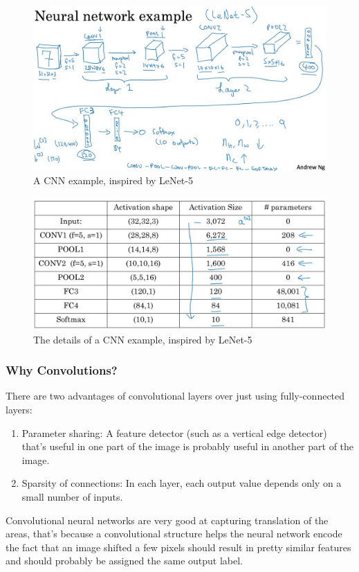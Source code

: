 \documentclass[UTF8]{article}
\begin{document}
\begin{figure}[htb]
    \centering
    \includegraphics[width=40em]{figures/cnn-example}
    \caption{A CNN example, inspired by LeNet-5}
    \label{fig:cnn-example}
\end{figure}

\begin{figure}[htb]
    \centering
    \includegraphics[width=40em]{figures/cnn-example-details}
    \caption{The details of a CNN example, inspired by LeNet-5}
    \label{fig:cnn-example-details}
\end{figure}

\subsubsection{Why Convolutions?}
There are two advantages of convolutional layers over just using fully-connected layers:
\begin{enumerate}
    \item Parameter sharing: A feature detector (such as a vertical edge detector) that's useful in
    one part of the image is probably useful in another part of the image.
    \item Sparsity of connections: In each layer, each output value depends only on a small number
    of inputs.
\end{enumerate}

Convolutional neural networks are very good at capturing translation of the areas, that's because
a convolutional structure helps the neural network encode the fact that an image shifted a few
pixels should result in pretty similar features and should probably be assigned the same output
label.
\end{document}
